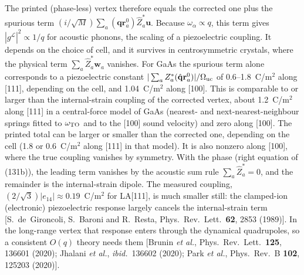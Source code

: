 The printed (phase-less) vertex therefore equals the corrected one plus the spurious term $(i/\sqrt M)\sum_a(\mathbf q\mathbf r^0_a)\hat Z^*_a\mathbf u$. Because $\omega_\alpha\propto q$, this term gives $|g^{\mathcal L}|^2\propto1/q$ for acoustic phonons, the scaling of a piezoelectric coupling. It depends on the choice of cell, and it survives in centrosymmetric crystals, where the physical term $\sum_a\hat Z^*_a\mathbf w_a$ vanishes. For GaAs the spurious term alone corresponds to a piezoelectric constant $|\sum_aZ^*_a(\hat{\mathbf q}\mathbf r^0_a)|/\Omega_{\rm uc}$ of 0.6--1.8~C/m$^2$ along [111], depending on the cell, and 1.04~C/m$^2$ along [100]. This is comparable to or larger than the internal-strain coupling of the corrected vertex, about 1.2~C/m$^2$ along [111] in a central-force model of GaAs (nearest- and next-nearest-neighbour springs fitted to $\omega_{\rm TO}$ and to the [100] sound velocity) and zero along [100]. The printed total can be larger or smaller than the corrected one, depending on the cell (1.8 or 0.6~C/m$^2$ along [111] in that model). It is also nonzero along [100], where the true coupling vanishes by symmetry. With the phase (right equation of (131b)), the leading term vanishes by the acoustic sum rule $\sum_a\hat Z^*_a=0$, and the remainder is the internal-strain dipole. The measured coupling, $(2/\sqrt3)|e_{14}|\approx0.19$~C/m$^2$ for LA[111], is much smaller still: the clamped-ion (electronic) piezoelectric response largely cancels the internal-strain term [S.~de~Gironcoli, S.~Baroni and R.~Resta, Phys.\ Rev.\ Lett.\ \textbf{62}, 2853 (1989)]. In the long-range vertex that response enters through the dynamical quadrupoles, so a consistent $O(q)$ theory needs them [Brunin \textit{et al.}, Phys.\ Rev.\ Lett.\ \textbf{125}, 136601 (2020); Jhalani \textit{et al.}, \textit{ibid.}\ 136602 (2020); Park \textit{et al.}, Phys.\ Rev.\ B \textbf{102}, 125203 (2020)].

